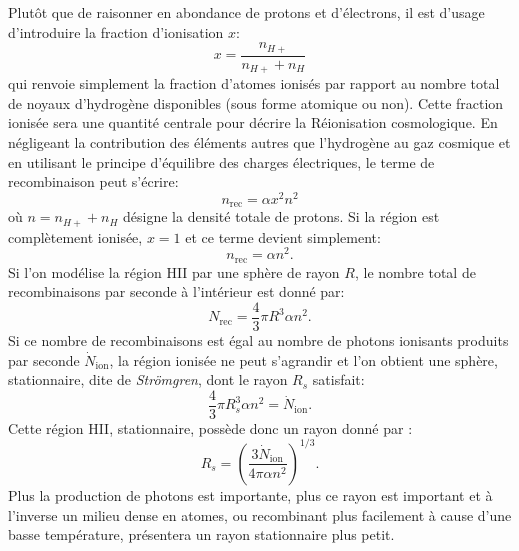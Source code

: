 Plutôt que de raisonner en abondance de protons et d'électrons, il est d'usage d'introduire la fraction d'ionisation $x$:
\begin{equation}
x=\frac{n_{H+}}{n_{H+}+n_H}
\end{equation}
qui renvoie simplement la fraction d'atomes ionisés par rapport au nombre total de noyaux d'hydrogène disponibles (sous forme atomique ou non). Cette fraction ionisée sera une quantité centrale pour décrire la Réionisation cosmologique. En négligeant la contribution des éléments autres que l'hydrogène au gaz cosmique et en utilisant le principe d'équilibre des charges électriques, le terme de recombinaison peut s'écrire:
\begin{equation}
n_\mathrm{rec}=\alpha x^2 n^2
\end{equation}
où $n=n_{H+}+n_H$ désigne la densité totale de protons. Si la région est complètement ionisée, $x=1$ et ce terme devient simplement:
\begin{equation}
n_\mathrm{rec}=\alpha n^2.
\end{equation}
Si l’on modélise la région HII par une sphère de rayon $R$, le nombre total de recombinaisons par seconde à l'intérieur est donné par:
\begin{equation}
N_\mathrm{rec}=\frac{4}{3}\pi R^3\alpha n^2.
\end{equation}
Si ce nombre de recombinaisons est égal au nombre de photons ionisants produits par seconde $ \dot N_\mathrm{ion}$, la région ionisée ne peut s'agrandir et l’on obtient une sphère, stationnaire, dite de \textit{Strömgren}, dont le rayon $R_s$ satisfait:
\begin{equation}
\frac{4}{3}\pi R_s^3\alpha n^2=\dot N_\mathrm{ion}.
\end{equation}
Cette région HII, stationnaire, possède donc un rayon donné par :
\begin{equation}
R_s=\left(\frac{3 \dot N_\mathrm{ion}}{4\pi \alpha n^2}\right)^{1/3}.
\end{equation}
Plus la production de photons est importante, plus ce rayon est important et à l'inverse un milieu dense en atomes, ou recombinant plus facilement à cause d'une basse température, présentera un rayon stationnaire plus petit.

